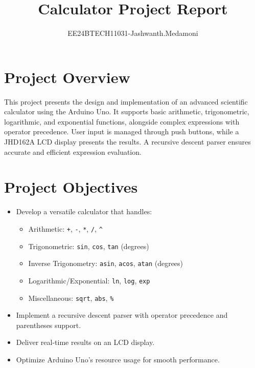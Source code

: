 \documentclass{article}
\theoremstyle{remark}
\begin{document}

\vspace{3cm}

\title{Calculator Project Report}
\author{EE24BTECH11031-Jashwanth.Medamoni}
\date{}
\maketitle
\bigskip

\renewcommand{\thefigure}{\theenumi}
\renewcommand{\thetable}{\theenumi}

\section{Project Overview}
This project presents the design and implementation of an advanced scientific calculator using the Arduino Uno. It supports basic arithmetic, trigonometric, logarithmic, and exponential functions, alongside complex expressions with operator precedence. User input is managed through push buttons, while a JHD162A LCD display presents the results. A recursive descent parser ensures accurate and efficient expression evaluation.

\section{Project Objectives}
\begin{itemize}[noitemsep]
    \item Develop a versatile calculator that handles:
    \begin{itemize}[noitemsep]
        \item Arithmetic: \texttt{+}, \texttt{-}, \texttt{*}, \texttt{/}, \texttt{\textasciicircum}
        \item Trigonometric: \texttt{sin}, \texttt{cos}, \texttt{tan} (degrees)
        \item Inverse Trigonometry: \texttt{asin}, \texttt{acos}, \texttt{atan} (degrees)
        \item Logarithmic/Exponential: \texttt{ln}, \texttt{log}, \texttt{exp}
        \item Miscellaneous: \texttt{sqrt}, \texttt{abs}, \texttt{\%}
    \end{itemize}
    \item Implement a recursive descent parser with operator precedence and parentheses support.
    \item Deliver real-time results on an LCD display.
    \item Optimize Arduino Uno's resource usage for smooth performance.
\end{itemize}
\end{document}
